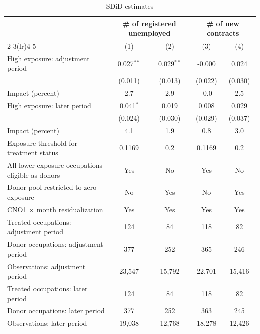 \begin{table}[H]
\centering
\caption{SDiD estimates}
\label{tab:v1_sdid}
\begin{threeparttable}
\small
\setlength{\tabcolsep}{4pt}
\begin{tabular}{lcccc}
\toprule
& \multicolumn{2}{c}{\# of registered unemployed} & \multicolumn{2}{c}{\# of new contracts} \\
\cmidrule(lr){2-3}\cmidrule(lr){4-5}
& (1) & (2) & (3) & (4) \\
\midrule
High exposure: adjustment period & 0.027$^{**}$ & 0.029$^{**}$ & -0.000 & 0.024 \\
 & (0.011) & (0.013) & (0.022) & (0.030) \\
Impact (percent) & 2.7 & 2.9 & -0.0 & 2.5 \\
\addlinespace
High exposure: later period & 0.041$^{*}$ & 0.019 & 0.008 & 0.029 \\
 & (0.024) & (0.030) & (0.029) & (0.037) \\
Impact (percent) & 4.1 & 1.9 & 0.8 & 3.0 \\
\midrule
Exposure threshold for treatment status & 0.1169 & 0.2 & 0.1169 & 0.2 \\
All lower-exposure occupations eligible as donors & Yes & No & Yes & No \\
Donor pool restricted to zero exposure & No & Yes & No & Yes \\
CNO1 $\times$ month residualization & Yes & Yes & Yes & Yes \\
Treated occupations: adjustment period & 124 & 84 & 118 & 82 \\
Donor occupations: adjustment period & 377 & 252 & 365 & 246 \\
Observations: adjustment period & 23,547 & 15,792 & 22,701 & 15,416 \\
Treated occupations: later period & 124 & 84 & 118 & 82 \\
Donor occupations: later period & 377 & 252 & 363 & 245 \\
Observations: later period & 19,038 & 12,768 & 18,278 & 12,426 \\
\bottomrule
\end{tabular}
\begin{tablenotes}[flushleft]
\footnotesize

\end{tablenotes}
\end{threeparttable}
\end{table}
